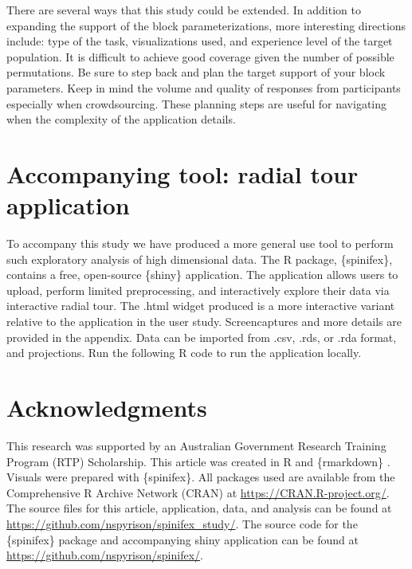 \documentclass{template/monashthesis}
\begin{document}
There are several ways that this study could be extended. In addition to expanding the support of the block parameterizations, more interesting directions include: type of the task, visualizations used, and experience level of the target population. It is difficult to achieve good coverage given the number of possible permutations. Be sure to step back and plan the target support of your block parameters. Keep in mind the volume and quality of responses from participants especially when crowdsourcing. These planning steps are useful for navigating when the complexity of the application details.

\hypertarget{sec:spinifex}{%
\section{Accompanying tool: radial tour application}\label{sec:spinifex}}

To accompany this study we have produced a more general use tool to perform such exploratory analysis of high dimensional data. The R package, \{spinifex\}, \autocite{spyrison_spinifex_2020} contains a free, open-source \{shiny\} \autocite{chang_shiny_2020} application. The application allows users to upload, perform limited preprocessing, and interactively explore their data via interactive radial tour. The .html widget produced is a more interactive variant relative to the application in the user study. Screencaptures and more details are provided in the appendix. Data can be imported from .csv, .rds, or .rda format, and projections. Run the following R code to run the application locally.

\begin{Shaded}
\begin{Highlighting}[]
\NormalTok{(}\NormalTok{, } \NormalTok{)}
\SpecialCharTok{::}\NormalTok{(}\NormalTok{)}
\end{Highlighting}
\end{Shaded}

\hypertarget{sec:acknowledgments}{%
\section{Acknowledgments}\label{sec:acknowledgments}}

This research was supported by an Australian Government Research Training Program (RTP) Scholarship. This article was created in R \autocite{r_core_team_r:_2020} and \{rmarkdown\} \autocite{xie_r_2018}. Visuals were prepared with \{spinifex\}. All packages used are available from the Comprehensive R Archive Network (CRAN) at \url{https://CRAN.R-project.org/}. The source files for this article, application, data, and analysis can be found at \url{https://github.com/nspyrison/spinifex_study/}. The source code for the \{spinifex\} package and accompanying shiny application can be found at \url{https://github.com/nspyrison/spinifex/}.
\end{document}
